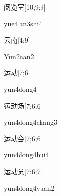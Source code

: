 \begin{verbete}{阅览室}[10;9;9]
\begin{pronuncia}{yue4lan3shi4}
\end{pronuncia}
\end{verbete}

\begin{verbete}{云南}[4;9]
\begin{pronuncia}{Yun2nan2}
\end{pronuncia}
\end{verbete}

\begin{verbete}{运动}[7;6]
\begin{pronuncia}{yun4dong4}
\end{pronuncia}
\end{verbete}

\begin{verbete}{运动场}[7;6;6]
\begin{pronuncia}[\\]{yun4dong4chang3}
\end{pronuncia}
\end{verbete}

\begin{verbete}{运动会}[7;6;6]
\begin{pronuncia}{yun4dong4hui4}
\end{pronuncia}
\end{verbete}

\begin{verbete}{运动员}[7;6;7]
\begin{pronuncia}[\\]{yun4dong4yuan2}
\end{pronuncia}
\end{verbete}

